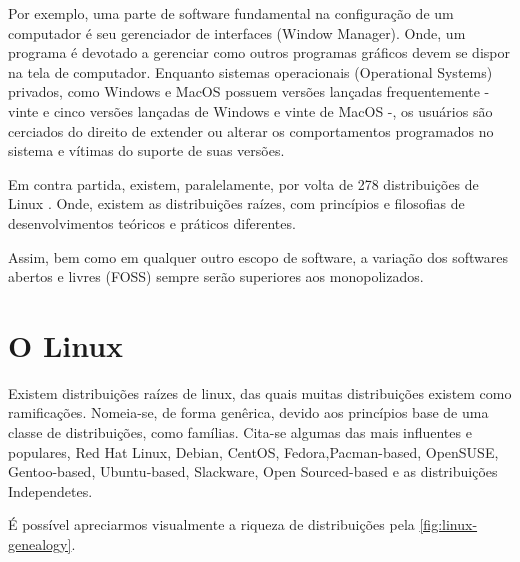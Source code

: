 \documentclass[
12pt,				%
openright,			%
oneside,			%
a4paper,			%
english,			%
french,				%
spanish,			%
brazil,				%
]{abntex2}
\begin{document}
Por exemplo, uma parte de software fundamental na configuração de um computador é seu gerenciador de interfaces (Window Manager). Onde, um programa é devotado a gerenciar como outros programas gráficos devem se dispor na tela de computador. Enquanto sistemas operacionais (Operational Systems) privados, como Windows e MacOS possuem versões lançadas frequentemente - vinte e cinco versões lançadas de Windows \cite{} e vinte de MacOS \cite{} -, os usuários são cerciados do direito de extender ou alterar os comportamentos programados no sistema e vítimas do suporte de suas versões.

Em contra partida, existem, paralelamente, por volta de 278 distribuições de Linux \cite{}. Onde, existem as distribuições raízes, com princípios e filosofias de desenvolvimentos teóricos e práticos diferentes.

Assim, bem como em qualquer outro escopo de software, a variação dos softwares abertos e livres (FOSS) sempre serão superiores aos monopolizados.


\section{O Linux}

Existem distribuições raízes de linux, das quais muitas distribuições existem como ramificações. Nomeia-se, de forma genêrica, devido aos princípios base de uma classe de distribuições, como famílias. Cita-se algumas das mais influentes e populares, Red Hat Linux, Debian, CentOS, Fedora,Pacman-based, OpenSUSE, Gentoo-based, Ubuntu-based, Slackware, Open Sourced-based e as distribuições Independetes.

É possível apreciarmos visualmente a riqueza de distribuições pela \autoref{fig:linux-genealogy}.
\end{document}
